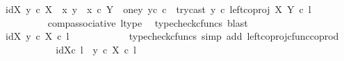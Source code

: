 \begin{isabellebody}
\ {\isachardoublequoteopen}{\isachardot}{\kern0pt}{\isachardot}{\kern0pt}{\isachardot}{\kern0pt}\ {\isacharequal}{\kern0pt}\ {\isacharparenleft}{\kern0pt}{\isasymlangle}id{\isacharparenleft}{\kern0pt}X{\isacharparenright}{\kern0pt}{\isacharcomma}{\kern0pt}\ y{}\ {\isasymcirc}\isactrlsub c\ {\isasymbeta}\isactrlbsub X\isactrlesub {\isasymrangle}\ {\isasymamalg}\ {\isacharparenleft}{\kern0pt}{\isacharparenleft}{\kern0pt}{\isasymlangle}x{}{\isacharcomma}{\kern0pt}\ y{}{\isasymrangle}\ {\isasymamalg}\ {\isasymlangle}x{}\ {\isasymcirc}\isactrlsub c\ {\isasymbeta}\isactrlbsub Y\ {\isasymsetminus}\ {\isacharparenleft}{\kern0pt}one{\isacharcomma}{\kern0pt}y{}{\isacharparenright}{\kern0pt}\isactrlesub {\isacharcomma}{\kern0pt}\ y{}\isactrlsup c{\isasymrangle}{\isacharparenright}{\kern0pt}\ {\isasymcirc}\isactrlsub c\ \ try{\isacharunderscore}{\kern0pt}cast\ y{}{\isacharparenright}{\kern0pt}\ {\isasymcirc}\isactrlsub c\ left{\isacharunderscore}{\kern0pt}coproj\ X\ Y{\isacharparenright}{\kern0pt}\ {\isasymcirc}\isactrlsub c\ l{\isachardoublequoteclose}\isanewline
\ \ \ \ \ \ \ \ \ \ \isamarkupfalse%
\ comp{\isacharunderscore}{\kern0pt}associative{}\ l{\isacharunderscore}{\kern0pt}type\ \isamarkupfalse%
\ {\isacharparenleft}{\kern0pt}typecheck{\isacharunderscore}{\kern0pt}cfuncs{\isacharcomma}{\kern0pt}\ blast{\isacharparenright}{\kern0pt}\isanewline
\ \ \ \ \ \ \ \ \isamarkupfalse%
\ \isamarkupfalse%
\ {\isachardoublequoteopen}{\isachardot}{\kern0pt}{\isachardot}{\kern0pt}{\isachardot}{\kern0pt}\ {\isacharequal}{\kern0pt}\ {\isasymlangle}id{\isacharparenleft}{\kern0pt}X{\isacharparenright}{\kern0pt}{\isacharcomma}{\kern0pt}\ y{}\ {\isasymcirc}\isactrlsub c\ {\isasymbeta}\isactrlbsub X\isactrlesub {\isasymrangle}\ {\isasymcirc}\isactrlsub c\ l{\isachardoublequoteclose}\isanewline
\ \ \ \ \ \ \ \ \ \ \isamarkupfalse%
\ {\isacharparenleft}{\kern0pt}typecheck{\isacharunderscore}{\kern0pt}cfuncs{\isacharcomma}{\kern0pt}\ simp\ add{\isacharcolon}{\kern0pt}\ left{\isacharunderscore}{\kern0pt}coproj{\isacharunderscore}{\kern0pt}cfunc{\isacharunderscore}{\kern0pt}coprod{\isacharparenright}{\kern0pt}\isanewline
\ \ \ \ \ \ \ \ \isamarkupfalse%
\ \isamarkupfalse%
\ {\isachardoublequoteopen}{\isachardot}{\kern0pt}{\isachardot}{\kern0pt}{\isachardot}{\kern0pt}\ {\isacharequal}{\kern0pt}\ {\isasymlangle}id{\isacharparenleft}{\kern0pt}X{\isacharparenright}{\kern0pt}{\isasymcirc}\isactrlsub c\ l\ {\isacharcomma}{\kern0pt}\ {\isacharparenleft}{\kern0pt}y{}\ {\isasymcirc}\isactrlsub c\ {\isasymbeta}\isactrlbsub X\isactrlesub {\isacharparenright}{\kern0pt}\ {\isasymcirc}\isactrlsub c\ l{\isasymrangle}{\isachardoublequoteclose}\isanewline

\end{isabellebody}
